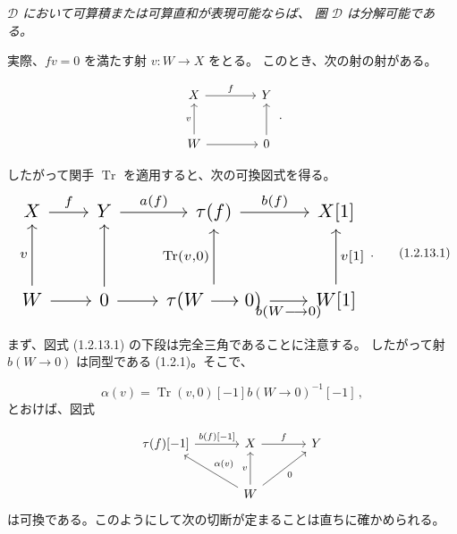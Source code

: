 \clearpage
{}%
\begingroup
\small
\setlength{\emergencystretch}{1.5em}%
\setlength{\abovedisplayskip}{4pt plus 2pt minus 2pt}%
\setlength{\belowdisplayskip}{4pt plus 2pt minus 2pt}%

\textit{$\mathcal D$ において可算積または可算直和が表現可能ならば、
圏 $\mathcal D$ は分解可能である。}

実際、$fv=0$ を満たす射 $v\colon W\longrightarrow X$ をとる。
このとき、次の射の射がある。

\[
  \begin{tikzcd}[column sep=4em,row sep=2.5em]
    X \arrow[r,"f"] & Y \\
    W \arrow[u,"v"] \arrow[r] & 0 \arrow[u]
  \end{tikzcd}
  \,.
\]

したがって関手 $\operatorname{Tr}$ を適用すると、次の可換図式を得る。
\begin{equation}
  \resizebox{0.82\linewidth}{!}{%
    $\begin{tikzcd}[ampersand replacement=\&,column sep=2.05em,row sep=3em]
      X \arrow[r,"f"]
        \& Y \arrow[r,"{a(f)}"]
        \& \tau(f) \arrow[r,"{b(f)}"]
        \& X[1] \\
      W \arrow[u,"v"] \arrow[r]
        \& 0 \arrow[u] \arrow[r]
        \& \tau(W\longrightarrow 0) \arrow[u,"{\operatorname{Tr}(v,0)}"]
          \arrow[r,"{b(W\longrightarrow 0)}"']
        \& W[1] \arrow[u,"{v[1]}"']
    \end{tikzcd}$%
  }\,.
  \tag{1.2.13.1}
\end{equation}

まず、図式 (1.2.13.1) の下段は完全三角であることに注意する。
したがって射 $b(W\longrightarrow 0)$ は同型である (1.2.1)。そこで、

\[
  \alpha(v)=\operatorname{Tr}(v,0)[-1]
  b(W\longrightarrow 0)^{-1}[-1]\,,
\]
とおけば、図式

\[
  \begin{tikzcd}[column sep=3.5em,row sep=2.4em]
    \tau(f)[-1] \arrow[r,"{b(f)[-1]}"]
      & X \arrow[r,"f"]
      & Y \\
      & W \arrow[ul,"{\alpha(v)}"'] \arrow[u,"v"] \arrow[ur,"0"']
  \end{tikzcd}
\]
は可換である。このようにして次の切断が定まることは直ちに確かめられる。
\par

